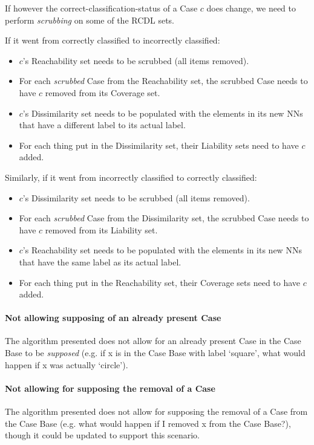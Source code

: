 \documentclass[a4paper,11pt]{report}
\begin{document}
If however the correct-classification-status of a Case $c$ does change, we need to perform \emph{scrubbing} on some of the RCDL sets.

If it went from correctly classified to incorrectly classified:
\begin{itemize}
	\item $c$'s Reachability set needs to be scrubbed (all items removed).
	\item For each \emph{scrubbed} Case from the Reachability set, the scrubbed Case needs to have $c$ removed from its Coverage set.
	\item $c$'s Dissimilarity set needs to be populated with the elements in its new NNs that have a different label to its actual label.
	\item For each thing put in the Dissimilarity set, their Liability sets need to have $c$ added.
\end{itemize}

Similarly, if it went from incorrectly classified to correctly classified:
\begin{itemize}
	\item $c$'s Dissimilarity set needs to be scrubbed (all items removed).
	\item For each \emph{scrubbed} Case from the Dissimilarity set, the scrubbed Case needs to have $c$ removed from its Liability set.
	\item $c$'s Reachability set needs to be populated with the elements in its new NNs that have the same label as its actual label.
	\item For each thing put in the Reachability set, their Coverage sets need to have $c$ added.
\end{itemize}

\paragraph{Not allowing supposing of an already present Case}
The algorithm presented does not allow for an already present Case in the Case Base to be \emph{supposed} (e.g. if x is in the Case Base with label `square', what would happen if x was actually `circle').

\paragraph{Not allowing for supposing the removal of a Case}
The algorithm presented does not allow for supposing the removal of a Case from the Case Base (e.g. what would happen if I removed x from the Case Base?), though it could be updated to support this scenario.
\end{document}
